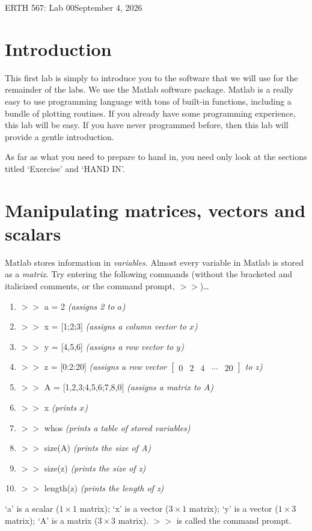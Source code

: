 \documentclass[letter]{article}
\begin{document}
\large{ERTH 567: Lab 00}\hfill \large{September 4, 2026}\\

\section*{Introduction}
This first lab is simply to introduce you to the software that we will
use for the remainder of the labs.  We use the Matlab software
package.  Matlab is a really easy to use programming language with
tons of built-in functions, including a bundle of plotting
routines. If you already have some programming experience, this lab
will be easy.  If you have never programmed before, then this lab will
provide a gentle introduction.

As far as what you need to prepare to hand in, you need only look at
the sections titled `Exercise' and `HAND IN'.

\section*{Manipulating matrices, vectors and scalars}
Matlab stores information in \emph{variables}.  Almost every variable in
Matlab is stored as a \emph{matrix}.  Try entering the following
commands (without the bracketed and italicized comments, or the
command prompt, $>>$)\ldots
\begin{enumerate}
\item $>>$ a = 2 \emph{(assigns 2 to $a$)}
\item $>>$ x = [1;2;3] \emph{(assigns a column vector to $x$)}
\item $>>$ y = [4,5,6] \emph{(assigns a row vector to $y$)}
\item $>>$ z = [0:2:20] \emph{(assigns a row vector
$\left[\begin{array}{ccccc} 0 & 2 & 4 & \cdots & 20 \end{array}\right]$ to $z$)}
\item $>>$ A = [1,2,3;4,5,6;7,8,0] \emph{(assigns a matrix to $A$)}
\item $>>$ x \emph{(prints $x$)}
\item $>>$ whos \emph{(prints a table of stored variables)}
\item $>>$ size(A) \emph{(prints the size of A)}
\item $>>$ size(z) \emph{(prints the size of z)}
\item $>>$ length(z) \emph{(prints the length of z)}
\end{enumerate}
`a' is a scalar ($1\times 1$ matrix); `x' is a vector ($3\times 1$
matrix); `y' is a vector ($1\times 3$ matrix); `A' is a matrix ($3\times 3$
matrix). $>>$ is called the command prompt.
\end{document}
